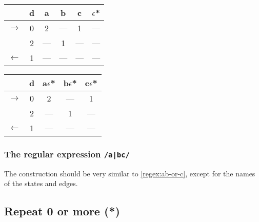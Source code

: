 \documentclass[toc=flat]{scrartcl}
\begin{document}
  \begin{center}
    \begin{tabular}{cc|cccc}
       \toprule
                     & d &  a  &  b  &  c  & $\epsilon$* \\
       \midrule
       $\rightarrow$ & 0 &  2  & --- &  1  & --- \\
                     & 2 & --- &  1  & --- & --- \\
       $\leftarrow$  & 1 & --- & --- & --- & --- \\
       \bottomrule
    \end{tabular}
  \end{center}
  
  \begin{center}
    \begin{tabular}{cc|ccc}
      \toprule
                    & d & a$\epsilon$*  & b$\epsilon$* & c$\epsilon$* \\
      \midrule
      $\rightarrow$ &  0  &  2  & --- &  1  \\
                    &  2  & --- &  1  & --- \\
      $\leftarrow$  &  1  & --- & --- & --- \\
      \bottomrule
    \end{tabular}
  \end{center}
  
  \begin{center}
  \end{center}
  
  \subsubsection{The regular expression \texttt{/a|bc/}}
  
  The construction should be very similar to \vref{regex:ab-or-c}, except for the names of the states and edges.
  
  \subsection{Repeat 0 or more (*)}
  
\end{document}
